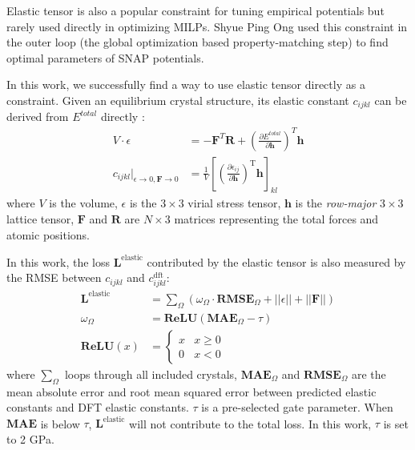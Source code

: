 \documentclass[prb,reprint]{revtex4-2}
\begin{document}
Elastic tensor is also a popular constraint for tuning empirical potentials but 
rarely used directly in optimizing MILPs. Shyue Ping Ong used this constraint in 
the outer loop (the global optimization based property-matching step) to find 
optimal parameters of SNAP potentials. 

In this work, we successfully find a way to use elastic tensor directly as a 
constraint. Given an equilibrium crystal structure, its elastic constant 
$c_{ijkl}$ can be derived from $E^{total}$ directly \cite{Elastic}:
\begin{align}
\label{eq:virial}
V \cdot \epsilon & = -\mathbf{F}^{T}\mathbf{R} + \left(
    \frac{\partial E^{total}}{\partial \mathbf{h}}\right)^T \mathbf{h} \\ 
\label{eq:cijkl}
c_{ijkl} |_{\epsilon \to 0, \mathbf{F} \to 0} & = \frac{1}{V}\left[
    \left( 
        \frac{\partial{\epsilon_{ij}}}{\partial{\mathbf{h}}}
    \right)^{\mathrm{T}}\mathbf{h}
\right]_{kl}
\end{align}
where $V$ is the volume, $\epsilon$ is the $3 \times 3$ virial stress tensor, 
$\mathbf{h}$ is the \textit{row-major} $3 \times 3$ lattice tensor, $\mathbf{F}$ 
and $\mathbf{R}$ are $N \times 3$ matrices representing the total forces and 
atomic positions.

In this work, the loss $\mathbf{L}^{\mathrm{elastic}}$ contributed by the 
elastic tensor is also measured by the RMSE between $c_{ijkl}$ and 
$c_{ijkl}^{\mathrm{dft}}$:
\begin{align}
\label{eq:cijkl_loss}
\mathbf{L}^{\mathrm{elastic}} 
& = \sum_{\Omega}{\left(
    \omega_{\Omega} \cdot \mathbf{RMSE}_{\Omega} 
    + ||\epsilon|| + ||\mathbf{F}||
\right)}
 \\
\label{eq:cijkl_loss_gate}
\omega_{\Omega} & = \mathbf{ReLU}(\mathbf{MAE}_{\Omega} - \tau) \\
\label{eq:relu}
\mathbf{ReLU}(x) & = \begin{cases}
    x & x \ge 0 \\
    0 & x < 0
\end{cases}
\end{align}
where $\sum_{\Omega}$ loops through all included crystals, 
$\mathbf{MAE}_{\Omega}$ and $\mathbf{RMSE}_{\Omega}$ are the mean absolute error 
and root mean squared error between predicted elastic constants and DFT elastic 
constants. $\tau$ is a pre-selected gate parameter. 
When $\mathbf{MAE}$ is below $\tau$, $\mathbf{L}^{\mathrm{elastic}}$ will not 
contribute to the total loss. In this work, $\tau$ is set to 2 GPa.
\end{document}
